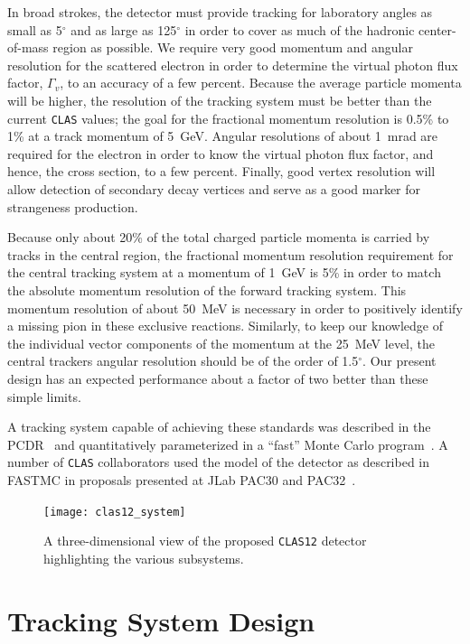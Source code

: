 In broad strokes, the detector must provide tracking for laboratory angles as 
small as 5$^\circ$ and as large as 125$^\circ$ in order to cover as much of 
the hadronic center-of-mass region as possible.  We require very good momentum 
and angular resolution for the scattered electron in order to determine the 
virtual photon flux factor, $\Gamma_v$, to an accuracy of a few percent.
Because the average particle momenta will be higher, the resolution of the 
tracking system must be better than the current {\tt CLAS} values; the goal 
for the fractional momentum resolution is 0.5\% to 1\% at a track momentum 
of 5~GeV.  Angular resolutions of about 1~mrad are required for the electron 
in order to know the virtual photon flux factor, and hence, the cross section, 
to a few percent. Finally, good vertex resolution will allow detection of 
secondary decay vertices and serve as a good marker for strangeness production.

Because only about 20\% of the total charged particle momenta is carried by 
tracks in the central region, the fractional momentum resolution requirement
for the central tracking system at a momentum of 1~GeV is 5\% in order to 
match the absolute momentum resolution of the forward tracking system.  This 
momentum resolution of about 50~MeV is necessary in order to positively 
identify a missing pion in these exclusive reactions.  Similarly, to keep our 
knowledge of the individual vector components of the momentum at the 25~MeV 
level, the central trackers angular resolution should be of the order of 
1.5$^\circ$.  Our present design has an expected performance about a factor 
of two better than these simple limits.  

A tracking system capable of achieving these standards was described in the 
PCDR~\cite{pcdr} and quantitatively parameterized in a ``fast'' Monte Carlo 
program~\cite{fastmc}.  A number of {\tt CLAS} collaborators used the model 
of the detector as described in FASTMC in proposals presented at JLab 
PAC30 and PAC32~\cite{PAC30,PAC32}.

\begin{figure}[ht]
\centering
\texttt{[image: clas12\_system]}
\caption{\small{A three-dimensional view of the proposed {\tt CLAS12} 
detector highlighting the various subsystems.}}
\label{clas12}
\end{figure}

\section{Tracking System Design}

